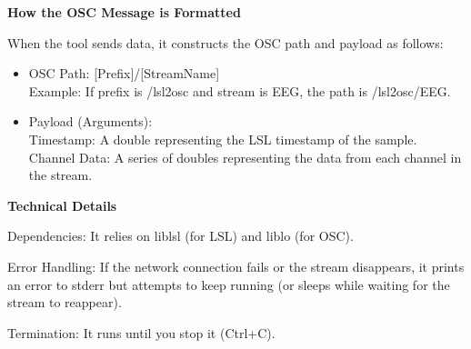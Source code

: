 {\bf How the OSC Message is Formatted}

When the tool sends data, it constructs the OSC path and payload as follows:

\begin{itemize}
\item OSC Path: [Prefix]/[StreamName]\\
  Example: If prefix is /lsl2osc and stream is EEG, the path is /lsl2osc/EEG.
\item Payload (Arguments):\\
  Timestamp: A double representing the LSL timestamp of the sample.\\
  Channel Data: A series of doubles representing the data from each channel in the stream.
\end{itemize}

{\bf Technical Details}

Dependencies: It relies on liblsl (for LSL) and liblo (for OSC).

Error Handling: If the network connection fails or the stream
disappears, it prints an error to stderr but attempts to keep running
(or sleeps while waiting for the stream to reappear).

Termination: It runs until you stop it (Ctrl+C).

